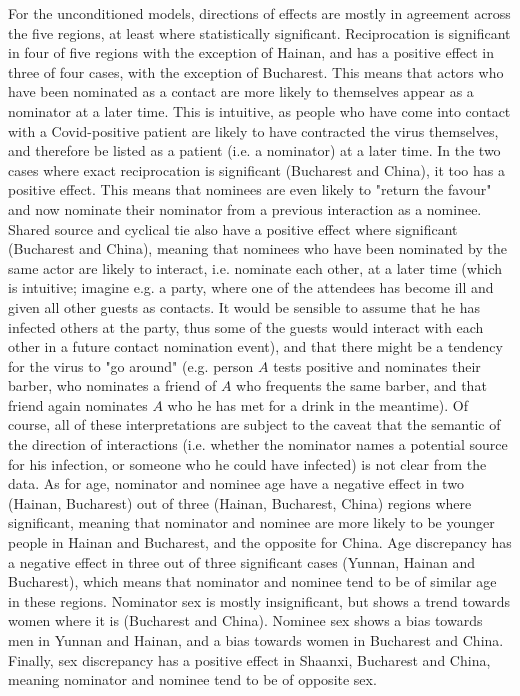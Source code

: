 For the unconditioned models, directions of effects are mostly in agreement across the five regions, at least where statistically significant. Reciprocation is significant in four of five regions with the exception of Hainan, and has a positive effect in three of four cases, with the exception of Bucharest. This means that actors who have been nominated as a contact are more likely to themselves appear as a nominator at a later time. This is intuitive, as people who have come into contact with a Covid-positive patient are likely to have contracted the virus themselves, and therefore be listed as a patient (i.e. a nominator) at a later time. In the two cases where exact reciprocation is significant (Bucharest and China), it too has a positive effect. This means that nominees are even likely to "return the favour" and now nominate their nominator from a previous interaction as a nominee. Shared source and cyclical tie also have a positive effect where significant (Bucharest and China), meaning that nominees who have been nominated by the same actor are likely to interact, i.e. nominate each other, at a later time (which is intuitive; imagine e.g. a party, where one of the attendees has become ill and given all other guests as contacts. It would be sensible to assume that he has infected others at the party, thus some of the guests would interact with each other in a future contact nomination event), and that there might be a tendency for the virus to "go around" (e.g. person $A$ tests positive and nominates their barber, who nominates a friend of $A$ who frequents the same barber, and that friend again nominates $A$ who he has met for a drink in the meantime). Of course, all of these interpretations are subject to the caveat that the semantic of the direction of interactions (i.e. whether the nominator names a potential source for his infection, or someone who he could have infected) is not clear from the data. As for age, nominator and nominee age have a negative effect in two (Hainan, Bucharest) out of three (Hainan, Bucharest, China) regions where significant, meaning that nominator and nominee are more likely to be younger people in Hainan and Bucharest, and the opposite for China. Age discrepancy has a negative effect in three out of three significant cases (Yunnan, Hainan and Bucharest), which means that nominator and nominee tend to be of similar age in these regions. Nominator sex is mostly insignificant, but shows a trend towards women where it is (Bucharest and China). Nominee sex shows a bias towards men in Yunnan and Hainan, and a bias towards women in Bucharest and China. Finally, sex discrepancy has a positive effect in Shaanxi, Bucharest and China, meaning nominator and nominee tend to be of opposite sex. 

